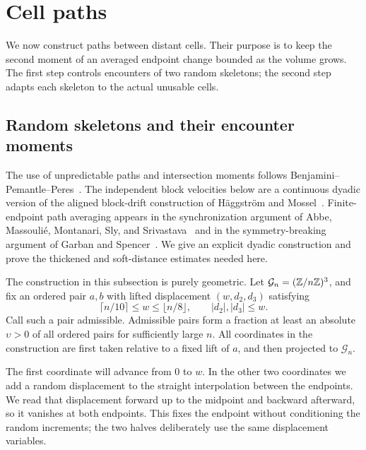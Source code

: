 \section{Cell paths}\label{sec:geometry}


We now construct paths between distant cells. Their purpose is to keep the
second moment of an averaged endpoint change bounded as the volume grows.
The first step controls encounters of two random skeletons; the second
step adapts each skeleton to the actual unusable cells.

\subsection{Random skeletons and their encounter moments}\label{sec:skeletons}

The use of unpredictable paths and intersection moments follows
Benjamini--Pemantle--Peres~\cite[Theorem~1.3 and Lemma~3.1]{BenjaminiPemantlePeres1998}.
The independent block velocities below are a continuous dyadic version
of the aligned block-drift construction of H\"aggstr\"om and
Mossel~\cite[Section~3, Proposition~3.1]{HaggstromMossel1998}.
Finite-endpoint path averaging appears in the synchronization argument
of Abbe, Massouli\'e, Montanari, Sly, and
Srivastava~\cite[Section~6, Lemma~6.1]{AbbeMassoulieMontanariSlySrivastava2018}
and in the symmetry-breaking argument of Garban and
Spencer~\cite[Section~2, Lemma~2.5]{GarbanSpencer2023}.
We give an explicit dyadic construction and prove the thickened and
soft-distance estimates needed here.

The construction in this subsection is purely geometric. Let
$\mathcal G_n=(\mathbb Z/n\mathbb Z)^3$, and fix an ordered pair $a,b$ with lifted
displacement $(w,d_2,d_3)$ satisfying
\[
 \lceil n/10\rceil\le w\le\lfloor n/8\rfloor,
 \qquad |d_2|,|d_3|\le w.
\]
Call such a pair admissible. Admissible pairs form a fraction at least
an absolute $\upsilon>0$ of all ordered pairs for sufficiently large $n$.
All coordinates in the construction are first taken relative to a fixed
lift of $a$, and then projected to $\mathcal G_n$.

The first coordinate will advance from $0$ to $w$. In the other two
coordinates we add a random displacement to the straight interpolation
between the endpoints. We read that displacement forward up to the
midpoint and backward afterward, so it vanishes at both endpoints.
This fixes the endpoint without conditioning the random increments;
the two halves deliberately use the same displacement variables.

